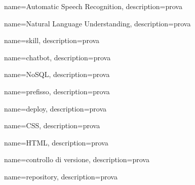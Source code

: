 {
	name=Automatic Speech Recognition,
	description={prova}
}

{
	name=Natural Language Understanding,
	description={prova}
}

{
	name=skill,
	description={prova}
}

{
	name=chatbot,
	description={prova}
}

{
	name=NoSQL,
	description={prova}
}

{
	name=prefisso,
	description={prova}
}

{
	name=deploy,
	description={prova}
}

{
	name=CSS,
	description={prova}
}

{
	name=HTML,
	description={prova}
}

{
	name=controllo di versione,
	description={prova}
}

{
	name=repository,
	description={prova}
}